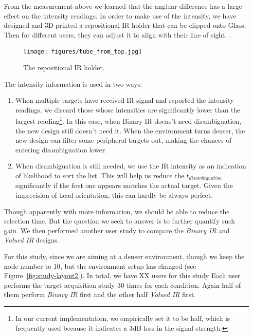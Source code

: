 From the measurement above we learned that the angluar difference has a large effect on the intensity readings. In order to make use of the intensity, we have designed and 3D printed a repositional IR holder that can be clipped onto Glass. Then for different users, they can adjust it to align with their line of sight. . 

\begin{figure}[t]
\centering
\texttt{[image: figures/tube\_from\_top.jpg]}
\caption{The repositional IR holder.}
\label{fig:measurement}
\end{figure}



The intensity information is used in two ways:
\begin{enumerate}
\item When multiple targets have received IR signal and reported the intensity readings, we discard those whose intensities are significantly lower than the largest reading\footnote{In our current implementation, we empirically set it to be half, which is frequently used because it indicates a 3dB loss in the signal strength.}. In this case, when Binary IR doens't need disambiguation, the new design still doesn't need it. When the environment turns denser, the new design can filter some peripheral targets out, making the chances of entering disambiguation lower.
\item When disambiguation is still needed, we use the IR intensity as an indication of likelihood to sort the list. This will help us reduce the $t_{disambiguation}$ significantly if the first one appears matches the actual target. Given the imprecision of head orientation, this can hardly be always perfect.
\end{enumerate}

Though apparently with more information, we should be able to reduce the selection time. But the question we seek to answer is to further quantify such gain. We then performed another user study to compare the {\em Binary IR} and {\em Valued IR} designs.

For this study, since we are aiming at a denser environment, though we keep the node number to 10, but the environment setup has changed (see Figure~\ref{fig:study-layout2}). In total, we have XX users for this study  Each user performs the target acquisition study 30 times for each condition. Again half of them perform {\em Binary IR} first and the other half {\em Valued IR} first.

